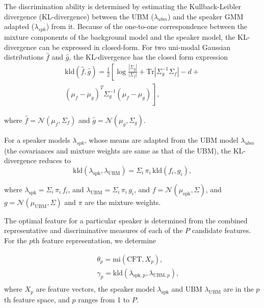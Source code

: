 \documentclass{article}
\begin{document}
The discrimination ability is determined by estimating the Kullback-Leibler divergence
(KL-divergence) between the UBM ($\lambda_{ubm}$) and the speaker GMM adapted 
($\lambda_{spk}$) from it. Because of the one-to-one
correspondence between the mixture components of the background model and the speaker model, 
the KL-divergence can be expressed in closed-form. For two uni-modal Gaussian distributions
$\hat{f}$ and $\hat{g}$, the KL-divergence has the closed form expression
\begin{equation}
\begin{split}
\textrm{kld}(\hat{f},\hat{g}) = \frac{1}{2}\left[ \log \frac{|\Sigma_g|}{|\Sigma_f|} +
	\textrm{Tr}|\Sigma^{-1}_g\Sigma_f| - d + \right. \\ 
\left. (\mu_f-\mu_g)^T\Sigma_g^{-1}(\mu_f-\mu_g) \frac{}{} \right], 
\end{split}
\label{eq:kldGaussians}
\end{equation}

where $\hat{f} = \mathcal{N}(\mu_f,\Sigma_f)$ and $\hat{g} = \mathcal{N}(\mu_g,\Sigma_g)$.

For a speaker models $\lambda_{spk}$, whose means are adapted from the UBM model
$\lambda_{ubm}$ (the covariances and mixture weights are same as that of the UBM), 
the KL-divergence reduces to 
\begin{equation}
\textrm{kld}(\lambda_{\textrm{spk}},\lambda_{\textrm{UBM}}) = 
	\Sigma_i\, \pi_i\, \textrm{kld}(f_i,g_i),
\label{eq:gmmAdaptedKLD}
\end{equation}


where $\lambda_{\textrm{spk}} = \Sigma_i \, \pi_i \, f_i$, and
$\lambda_{\textrm{UBM}} = \Sigma_i \, \pi_i \, g_i$, and
$f = \mathcal{N}(\mu_{\textrm{spk}},\Sigma)$, and
$g = \mathcal{N}(\mu_{\textrm{UBM}},\Sigma)$ and
$\pi$ are the mixture weights.


The optimal feature for a particular speaker is determined from the combined
representative and discriminative measures of each of the $P$ candidate
features. For the $p$th feature representation, we determine

\begin{eqnarray*}
&& \theta_p = \textrm{mi}(\textrm{CFT},X_{p}), \\
&& \gamma_p =
\textrm{kld}(\lambda_{\textrm{spk},p},\lambda_{\textrm{UBM},p}), \\
\end{eqnarray*} 
where $X_p$ are feature vectors, the speaker model $\lambda_{\textrm{spk}}$ and 
UBM $\lambda_{\textrm{UBM}}$ are in the $p$th feature space, and $p$ ranges from 1 to $P$.
\end{document}
